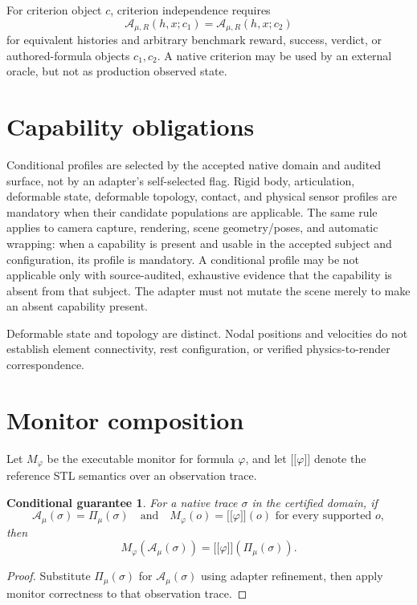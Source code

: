 \documentclass[11pt]{article}
\newcommand{\sem}[1]{\mathopen{[\![}#1\mathclose{]\!]}}
\newtheorem{theorem}{Conditional guarantee}
\begin{document}
For criterion object $c$, criterion independence requires
\[
  \mathcal{A}_{\mu,R}(h,x;c_1)
  =\mathcal{A}_{\mu,R}(h,x;c_2)
\]
for equivalent histories and arbitrary benchmark reward, success, verdict,
or authored-formula objects $c_1,c_2$.  A native criterion may be used by an
external oracle, but not as production observed state.

\section{Capability obligations}

Conditional profiles are selected by the accepted native domain and audited
surface, not by an adapter's self-selected flag.  Rigid body, articulation,
deformable state, deformable topology, contact, and physical sensor profiles
are mandatory when their candidate populations are applicable.  The same rule
applies to camera capture, rendering, scene geometry/poses, and automatic
wrapping: when a capability is present and usable in the accepted subject and
configuration, its profile is mandatory.  A conditional profile may be not
applicable only with source-audited, exhaustive evidence that the capability
is absent from that subject.  The adapter must not mutate the scene merely to
make an absent capability present.

Deformable state and topology are distinct.  Nodal positions and velocities
do not establish element connectivity, rest configuration, or verified
physics-to-render correspondence.

\section{Monitor composition}

Let $M_\varphi$ be the executable monitor for formula $\varphi$, and let
$\sem{\varphi}$ denote the reference STL semantics over an
observation trace.

\begin{theorem}
For a native trace $\sigma$ in the certified domain, if
\[
  \mathcal{A}_\mu(\sigma)=\Pi_\mu(\sigma)
  \quad\text{and}\quad
  M_\varphi(o)=\sem{\varphi}(o)
  \text{ for every supported }o,
\]
then
\[
  M_\varphi(\mathcal{A}_\mu(\sigma))
  =\sem{\varphi}(\Pi_\mu(\sigma)).
\]
\end{theorem}

\begin{proof}
Substitute $\Pi_\mu(\sigma)$ for $\mathcal{A}_\mu(\sigma)$ using adapter
refinement, then apply monitor correctness to that observation trace.
\end{proof}
\end{document}
